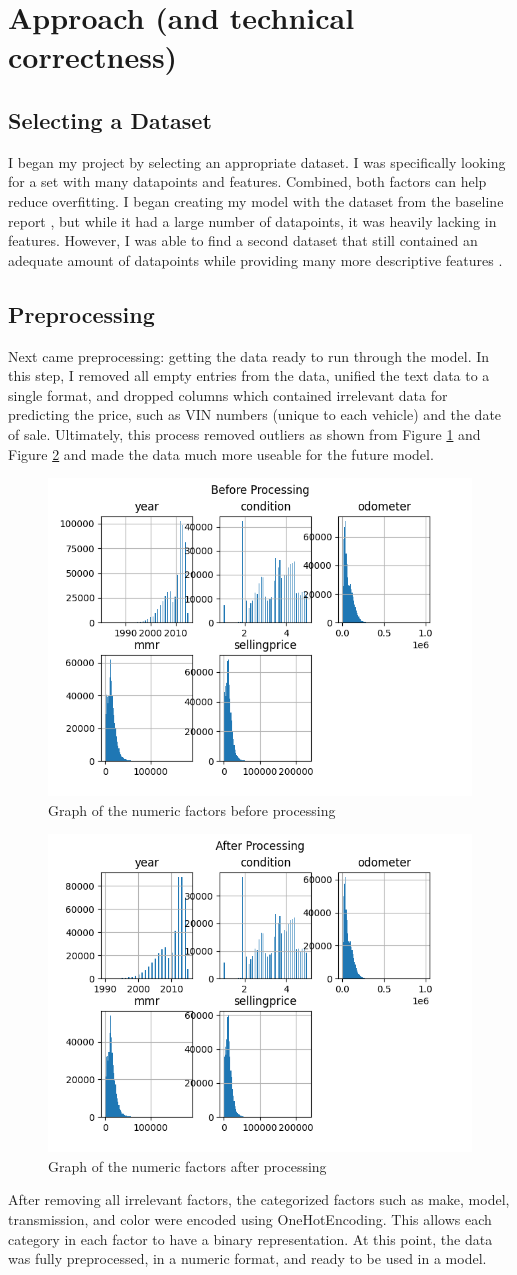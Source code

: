 \documentclass[compsoc]{IEEEtran}
\begin{document}
\section{Approach (and technical correctness)}
\subsection{Selecting a Dataset}
I began my project by selecting an appropriate dataset. I was specifically looking for a set with many datapoints and features. Combined, both factors can help reduce overfitting. I began creating my model with the dataset from the baseline report \cite{original_dataset}, but while it had a large number of datapoints, it was heavily lacking in features. However, I was able to find a second dataset that still contained an adequate amount of datapoints while providing many more descriptive features \cite{dataset}.
\subsection{Preprocessing}
Next came preprocessing: getting the data ready to run through the model. In this step, I removed all empty entries from the data, unified the text data to a single format, and dropped columns which contained irrelevant data for predicting the price, such as VIN numbers (unique to each vehicle) and the date of sale. Ultimately, this process removed outliers as shown from Figure \ref{fig:before_process} and Figure \ref{fig:after_process} and made the data much more useable for the future model.
\begin{figure}[h]
    \centering
    \includegraphics[width=.35\textwidth]{images/before_preprocessing.png}
    \caption{Graph of the numeric factors before processing}
    \label{fig:before_process}
\end{figure}
\begin{figure}[h]
    \centering
    \includegraphics[width=.35\textwidth]{images/after_preprocessing.png}
    \caption{Graph of the numeric factors after processing}
    \label{fig:after_process}
\end{figure}
After removing all irrelevant factors, the categorized factors such as make, model, transmission, and color were encoded using OneHotEncoding. This allows each category in each factor to have a binary representation. At this point, the data was fully preprocessed, in a numeric format, and ready to be used in a model.
\end{document}
